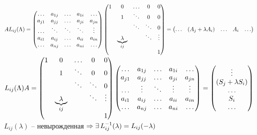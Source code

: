 \documentclass[12pt]{article}
\begin{document}
$AL_{ij}(\Lambda) = \begin{pmatrix}
    \ldots & a_{1j} & \ldots & a_{1i} & \ldots\\
    a_{j1} & a_{jj} & \ldots & a_{ji} & a_{jn}\\
    \ldots & \ddots & \ddots & \ddots & \vdots\\
    a_{i1} & a_{ij} & \ldots & a_{ii} & a_{in}\\
    \ldots & a_{nj} & \ldots & a_{ni} & \ldots\\
\end{pmatrix}\begin{pmatrix}
    1 & 0 & \ldots & 0 & 0\\
    & 1 & \ddots & 0 & 0\\
    & & \ddots & \ddots & 0\\
    & \underbrace{\lambda}_{ij} & & \ddots & \vdots\\
    & & & & 1
\end{pmatrix} = \begin{pmatrix}\ldots & (A_j + \lambda A_i) & \ldots & A_i & \ldots\end{pmatrix}$\\
$L_{ij}(\Lambda)A = \begin{pmatrix}
    1 & 0 & \ldots & 0 & 0\\
    & 1 & \ddots & 0 & 0\\
    & & \ddots & \ddots & 0\\
    & \underbrace{\lambda}_{ij} & & \ddots & \vdots\\
    & & & & 1
\end{pmatrix}\begin{pmatrix}
    \ldots & a_{1j} & \ldots & a_{1i} & \ldots\\
    a_{j1} & a_{jj} & \ldots & a_{ji} & a_{jn}\\
    \ldots & \vdots & \ddots & \vdots & \vdots\\
    a_{i1} & a_{ij} & \ldots & a_{ii} & a_{in}\\
    \ldots & a_{nj} & \ldots & a_{ni} & \ldots\\
\end{pmatrix} = \begin{pmatrix}\vdots\\ (S_j + \lambda S_i)\\ \ldots\\ S_i\\ \ldots\end{pmatrix}$
$L_{ij}(\lambda)$ -- невырожденная $\Rightarrow \exists\, L^{-1}_{ij}(\lambda) = L_{ij}(-\lambda)$\\
\end{document}

